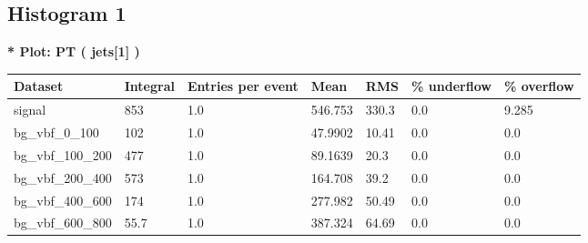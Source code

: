 \documentclass[a4paper, 10pt]{article}
\begin{document}
   \newpage
\subsection{ Histogram 1}

\textbf{* Plot: PT ( jets[1] ) }\\
   \begin{table}[H]
  \begin{center}
    \begin{tabular}{|m{23.0mm}|m{23.0mm}|m{18.0mm}|m{19.0mm}|m{19.0mm}|m{19.0mm}|m{19.0mm}|}
      \hline
      {\cellcolor{yellow}         Dataset}& {\cellcolor{yellow}         Integral}& {\cellcolor{yellow}         Entries per event}& {\cellcolor{yellow}         Mean}& {\cellcolor{yellow}         RMS}& {\cellcolor{yellow}         \% underflow}& {\cellcolor{yellow}         \% overflow}\\
      \hline
      {\cellcolor{white}         signal}& {\cellcolor{white}         853}& {\cellcolor{white}         1.0}& {\cellcolor{white}         546.753}& {\cellcolor{white}         330.3}& {\cellcolor{orange}         0.0}& {\cellcolor{orange}         9.285}\\
      \hline
      {\cellcolor{white}         bg\_vbf\_0\_100}& {\cellcolor{white}         102}& {\cellcolor{white}         1.0}& {\cellcolor{white}         47.9902}& {\cellcolor{white}         10.41}& {\cellcolor{green}         0.0}& {\cellcolor{green}         0.0}\\
      \hline
      {\cellcolor{white}         bg\_vbf\_100\_200}& {\cellcolor{white}         477}& {\cellcolor{white}         1.0}& {\cellcolor{white}         89.1639}& {\cellcolor{white}         20.3}& {\cellcolor{green}         0.0}& {\cellcolor{green}         0.0}\\
      \hline
      {\cellcolor{white}         bg\_vbf\_200\_400}& {\cellcolor{white}         573}& {\cellcolor{white}         1.0}& {\cellcolor{white}         164.708}& {\cellcolor{white}         39.2}& {\cellcolor{green}         0.0}& {\cellcolor{green}         0.0}\\
      \hline
      {\cellcolor{white}         bg\_vbf\_400\_600}& {\cellcolor{white}         174}& {\cellcolor{white}         1.0}& {\cellcolor{white}         277.982}& {\cellcolor{white}         50.49}& {\cellcolor{green}         0.0}& {\cellcolor{green}         0.0}\\
      \hline
      {\cellcolor{white}         bg\_vbf\_600\_800}& {\cellcolor{white}         55.7}& {\cellcolor{white}         1.0}& {\cellcolor{white}         387.324}& {\cellcolor{white}         64.69}& {\cellcolor{green}         0.0}& {\cellcolor{green}         0.0}\\

\end{tabular}
\end{center}
\end{table}
\end{document}
